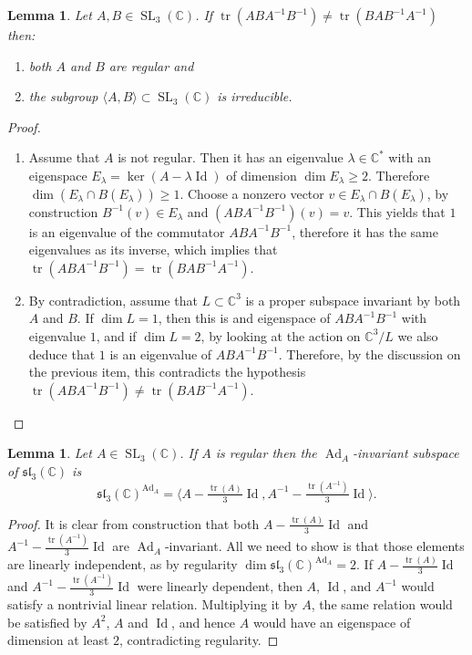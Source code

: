 \documentclass[11pt]{article}
\newtheorem{lemm}[theo]{Lemma}
\theoremstyle{definition}
\newenvironment{proofc}{\begin{proof}}{\end{proof}}
\numberwithin{equation}{section}
\numberwithin{figure}{section}
\numberwithin{table}{section}
\DeclareMathOperator{\SL}{SL}
\DeclareMathOperator{\Ad}{Ad}
\DeclareMathOperator{\Id}{Id}
\DeclareMathOperator{\tr}{tr}
\newcommand{\Cbb}{\mathbb{C}}
\newcommand{\slfrk}{\mathfrak{sl}}
\newcommand*{\romanenumi}{\renewcommand*{\theenumi}{\roman{enumi}}}
\begin{document}
\begin{lemm}\label{Lemma:regtr}
Let $A,B\in \SL_3(\Cbb)$. If $\tr(ABA^{-1}B^{-1})\neq \tr(BAB^{-1}A^{-1})$ then:
\begin{enumerate}\romanenumi
\item \label{list-lem8.2.1}
both $A$ and $B$ are regular and
\item \label{list-lem8.2.2}
the subgroup $\langle A,B \rangle \subset \SL_3(\Cbb)$ is irreducible.
\end{enumerate}
\end{lemm}
\goodbreak
\begin{proofc}
\begin{enumerate}\romanenumi
\item[{\eqref{list-lem8.2.1}}] Assume that $A$ is not regular. Then it has an eigenvalue $\lambda\in\Cbb^*$ with an eigenspace $E_\lambda=\ker(A-\lambda\Id)$ of dimension $\dim E_\lambda\geq 2$. Therefore $\dim (E_\lambda\cap B(E_\lambda))\geq 1$. Choose a nonzero vector $v\in E_\lambda\cap B(E_\lambda)$, by construction $B^{-1}(v)\in E_\lambda$ and $(ABA^{-1}B^{-1})(v)= v$. This yields that $1$ is an eigenvalue of the commutator $ABA^{-1}B^{-1}$, therefore it has the same eigenvalues as its inverse, which implies that $\tr(ABA^{-1}B^{-1})=\tr(BAB^{-1}A^{-1})$.

\item[{\eqref{list-lem8.2.2}}] By contradiction, assume that $L \subset \Cbb^3$ is a proper subspace invariant by both $A$ and $B$. If $\dim L=1$, then this is and eigenspace of $ABA^{-1}B^{-1}$ with eigenvalue $1$, and if $\dim L=2$, by looking at the action on $\Cbb^3/L$ we also deduce that $1$ is an eigenvalue of $ABA^{-1}B^{-1}$. Therefore, by the discussion on the previous item, this contradicts the hypothesis $\tr(ABA^{-1}B^{-1})\neq \tr(BAB^{-1}A^{-1})$.\qedhere
\end{enumerate}
\end{proofc}

\begin{lemm}\label{Lemma:reginv}
Let $A\in \SL_3(\Cbb)$. If $A$ is regular then the $\Ad_A$-invariant subspace of $\slfrk_3(\Cbb)$ is
\[
\slfrk_3(\Cbb)^{\Ad_A}=\langle A-\tfrac{\tr(A)}3\Id, A^{-1}-\tfrac{\tr(A^{-1})}3\Id\rangle.
\]
\end{lemm}

\begin{proof}
It is clear from construction that both $A-\frac{\tr(A)}3\Id$ and $A^{-1}-\frac{\tr(A^{-1})}3\Id$ are $\Ad_A$-invariant. All we need to show is that those elements are linearly independent, as by regularity $\dim \slfrk_3(\Cbb)^{\Ad_A}=2$. If $ A-\frac{\tr(A)}3\Id$ and $ A^{-1}-\frac{\tr(A^{-1})}3\Id$ were linearly dependent, then $A$, $\Id$, and $A^{-1}$ would satisfy a nontrivial linear relation. Multiplying it by $A$, the same relation would be satisfied by $A^2$, $A$ and $\Id$, and hence $A$ would have an eigenspace of dimension at least $2$, contradicting regularity.
\end{proof}
\end{document}
